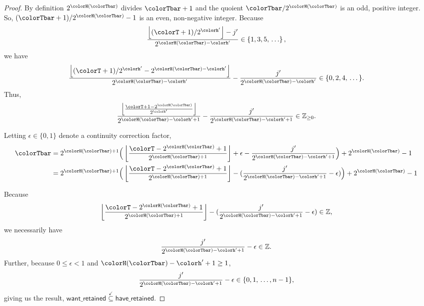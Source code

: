 \begin{proof}
By definition $2^{\colorH(\colorTbar)}$ divides $\colorTbar + 1$ and the quoient $\colorTbar / 2^{\colorH(\colorTbar)}$ is an odd, positive integer.
So, $(\colorTbar + 1) / 2^{\colorH(\colorTbar)} - 1$ is an even, non-negative integer.
Because
\begin{align*}
\frac{\left\lfloor (\colorT + 1) / 2^{\colorh'} \right\rfloor - j'}{2^{\colorH(\colorTbar) - \colorh'}} \in \{1, 3, 5, \, \ldots\} \, ,
\end{align*}
we have
\begin{align*}
\frac{\left\lfloor (\colorT + 1) / 2^{\colorh'} - 2^{\colorH(\colorTbar) - \colorh'} \right\rfloor}{2^{\colorH(\colorTbar) - \colorh'}}
- \frac{j'}{2^{\colorH(\colorTbar) - \colorh'}} \in \{0, 2, 4, \, \ldots \, \}.
\end{align*}
Thus,
\begin{align*}
\frac{
  \left\lfloor
  \frac{\colorT + 1 - 2^{\colorH(\colorTbar)}}{2^{\colorh'}}
  \right\rfloor
}{
  2^{\colorH(\colorTbar) - \colorh' + 1}
}
- \frac{j'}{
  2^{\colorH(\colorTbar) - \colorh' + 1}
}
\in \mathbb{Z}_{\geq0}.
\end{align*}

Letting $\epsilon \in \{0, 1\}$ denote a continuity correction factor,
\begin{align*}
\colorTbar
&= 2^{\colorH(\colorTbar) + 1}
\Big(
\left\lfloor
\frac{
  \colorT - 2^{\colorH(\colorTbar)} + 1
}{
  2^{\colorH(\colorTbar) + 1}
}
\right\rfloor
+ \epsilon
- \frac{j'}{2^{\colorH(\colorTbar) - \colorh' + 1}}
\Big)
+ 2^{\colorH(\colorTbar)}
- 1\\
&= 2^{\colorH(\colorTbar) + 1}
\Big(
\left\lfloor
\frac{
  \colorT - 2^{\colorH(\colorTbar)} + 1
}{
  2^{\colorH(\colorTbar) + 1}
}
\right\rfloor
- (
  \frac{j'}{2^{\colorH(\colorTbar) - \colorh' + 1}}
  - \epsilon
)
\Big)
+ 2^{\colorH(\colorTbar)}
- 1\\
\end{align*}

Because
\begin{align*}
\left\lfloor
\frac{
  \colorT - 2^{\colorH(\colorTbar)} + 1
}{
  2^{\colorH(\colorTbar) + 1}
}
\right\rfloor
- (
\frac{j'}{2^{\colorH(\colorTbar) - \colorh' + 1}}
- \epsilon
)
\in \mathbb{Z},
\end{align*}
we necessarily have
\begin{align*}
\frac{j'}{2^{\colorH(\colorTbar) - \colorh' + 1}}
- \epsilon
\in \mathbb{Z}.
\end{align*}
Further, because $0 \leq \epsilon < 1$ and $\colorH(\colorTbar) - \colorh'  + 1 \geq 1$,
\begin{align*}
\frac{j'}{2^{\colorH(\colorTbar) - \colorh' + 1}}
- \epsilon
\in
\{0, 1, \,\ldots, n - 1\},
\end{align*}
giving us the result, $\mathsf{want\_retained} \stackrel{\checkmark}{\subseteq} \mathsf{have\_retained}$.
\end{proof}
